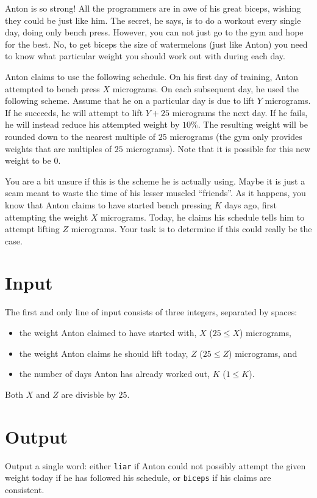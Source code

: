 Anton is so strong!
All the programmers are in awe of his great biceps, wishing they could be just like him.
The secret, he says, is to do a workout every single day, doing only bench press.
However, you can not just go to the gym and hope for the best.
No, to get biceps the size of watermelons (just like Anton) you need to know what particular weight you should work out with during each day.

Anton claims to use the following schedule.
On his first day of training, Anton attempted to bench press $X$ micrograms.
On each subsequent day, he used the following scheme.
Assume that he on a particular day is due to lift $Y$ micrograms.
If he succeeds, he will attempt to lift $Y + 25$ micrograms the next day.
If he fails, he will instead reduce his attempted weight by $10\%$.
The resulting weight will be rounded down to the nearest multiple of $25$ micrograms (the gym only provides weights that are multiples of $25$ micrograms).
Note that it is possible for this new weight to be $0$.

You are a bit unsure if this is the scheme he is actually using.
Maybe it is just a scam meant to waste the time of his lesser muscled ``friends''.
As it happens, you know that Anton claims to have started bench pressing $K$ days ago, first attempting the weight $X$ micrograms.
Today, he claims his schedule tells him to attempt lifting $Z$ micrograms.
Your task is to determine if this could really be the case.

\section*{Input}
The first and only line of input consists of three integers, separated by spaces:
\begin{itemize}
  \item the weight Anton claimed to have started with, $X$ ($25 \le X$) micrograms,
  \item the weight Anton claims he should lift today, $Z$ ($25 \le Z$) micrograms, and
  \item the number of days Anton has already worked out, $K$ ($1 \le K$).
\end{itemize}

Both $X$ and $Z$ are divisble by $25$.

\section*{Output}
Output a single word: either \texttt{liar} if Anton could not possibly attempt the given weight today if he has followed his schedule, or \texttt{biceps} if his claims are consistent.

